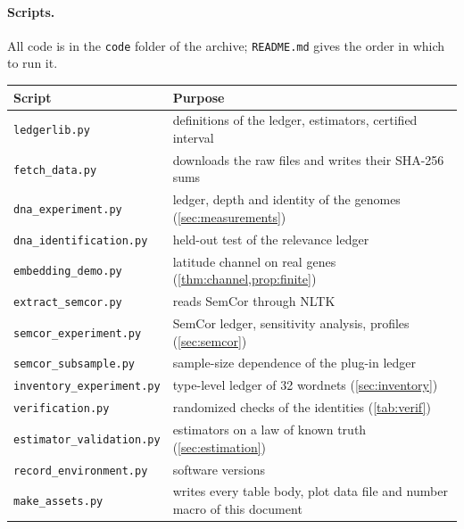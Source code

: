 \paragraph{Scripts.} All code is in the \texttt{code} folder of the archive; \texttt{README.md} gives the order in which to run it.
\begin{center}\small
\begin{tabular}{@{}l p{9.4cm}@{}}
\toprule
Script & Purpose \\
\midrule
\texttt{ledgerlib.py} & definitions of the ledger, estimators, certified interval \\
\texttt{fetch\_data.py} & downloads the raw files and writes their SHA-256 sums \\
\texttt{dna\_experiment.py} & ledger, depth and identity of the genomes (\cref{sec:measurements}) \\
\texttt{dna\_identification.py} & held-out test of the relevance ledger \\
\texttt{embedding\_demo.py} & latitude channel on real genes (\cref{thm:channel,prop:finite}) \\
\texttt{extract\_semcor.py} & reads SemCor through NLTK \\
\texttt{semcor\_experiment.py} & SemCor ledger, sensitivity analysis, profiles (\cref{sec:semcor}) \\
\texttt{semcor\_subsample.py} & sample-size dependence of the plug-in ledger \\
\texttt{inventory\_experiment.py} & type-level ledger of 32 wordnets (\cref{sec:inventory}) \\
\texttt{verification.py} & randomized checks of the identities (\cref{tab:verif}) \\
\texttt{estimator\_validation.py} & estimators on a law of known truth (\cref{sec:estimation}) \\
\texttt{record\_environment.py} & software versions \\
\texttt{make\_assets.py} & writes every table body, plot data file and number macro of this document \\
\bottomrule
\end{tabular}
\end{center}

